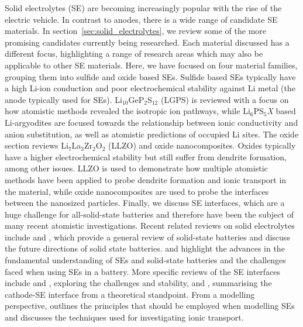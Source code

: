 \documentclass[../main.tex]{subfiles}
\begin{document}
Solid electrolytes (SE) are becoming increasingly popular with the rise of the electric vehicle.\cite{Woods_2021} In contrast to anodes, there is a wide range of candidate SE materials. In section~\ref{sec:solid_electrolytes}, we review some of the more promising candidates currently being researched. Each material discussed has a different focus, highlighting a range of research areas which may also be applicable to other SE materials. Here, we have focused on four material families, grouping them into sulfide and oxide based SEs. Sulfide based SEs typically have a high Li-ion conduction and poor electrochemical stability against Li metal (the anode typically used for SEs). \cite{Zhu2015, Zhang2019se_rev} Li$_{10}$GeP$_2$S$_{12}$ (LGPS) is reviewed with a focus on how atomistic methods revealed the isotropic ion pathways, while Li$_6$PS$_5$\textit{X} based Li-argyodites are focused towards the relationship between ionic conductivity and anion substitution, as well as atomistic predictions of occupied Li sites. The oxide section reviews Li$_7$La$_3$Zr$_2$O$_2$ (LLZO) and oxide nanocomposites. Oxides typically have a higher electrochemical stability but still suffer from dendrite formation, among other issues.\cite{Zhu2015} LLZO is used to demonstrate how multiple atomistic methods have been applied to probe dendrite formation and ionic transport in the material, while oxide nanocomposites are used to probe the interfaces between the nanosized particles. Finally, we discuss SE interfaces, which are a huge challenge for all-solid-state batteries and therefore have been the subject of many recent atomistic investigations. Recent related reviews on solid electrolytes include \citeauthor{Sun2017se_review} \cite{Sun2017se_review} and \citeauthor{Zhang2018se_review}, \cite{Zhang2018se_review} which provide a general review of solid-state batteries and discuss the future directions of solid state batteries. \citeauthor{famprikis_fundamentals_2019} \cite{famprikis_fundamentals_2019} and \citeauthor{Gurung2019} \cite{Gurung2019} highlight the advances in the fundamental understanding of SEs and solid-state batteries and the challenges faced when using SEs in a battery. More specific reviews of the SE interfaces include \citeauthor{Xu2018exp} \cite{Xu2018exp} and \citeauthor{Xiao2020interfacerev} \cite{Xiao2020interfacerev}, exploring the challenges and stability, and \citeauthor{Tateyama2019} \cite{Tateyama2019}, summarising the cathode-SE interface from a theoretical standpoint. From a modelling perspective, \citeauthor{Ceder2018} \cite{Ceder2018} outlines the principles that should be employed when modelling SEs and \citeauthor{Gao2020_ion_transport} \cite{Gao2020_ion_transport} discusses the techniques used for investigating ionic transport.
\end{document}
